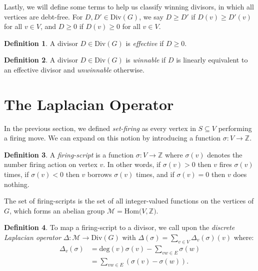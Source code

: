 \documentclass[openany, amssymb, psamsfonts]{amsart}
\theoremstyle{definition}
\newtheorem{defn}{Definition}[section]
\numberwithin{equation}{section}
\begin{document}
Lastly, we will define some terms to help us classify winning divisors, in which all vertices are debt-free. For $D, D'\in \text{Div}(G)$, we say $D\geq D'$ if $D(v)\geq D'(v)$ for all $v\in V$, and $D\geq 0$ if $D(v)\geq 0$ for all $v\in V$. 

\begin{defn}
\label{defn 3.6}
A divisor $D\in \text{Div}(G)$ is \textit{effective} if $D\geq 0$.
\end{defn}

\begin{defn}
\label{defn 3.7}
A divisor $D\in \text{Div}(G)$ is \textit{winnable} if $D$ is linearly equivalent to an effective divisor and \textit{unwinnable} otherwise.
\end{defn}





\section{The Laplacian Operator}
\label{4}

In the previous section, we defined \textit{set-firing} as every vertex in $S\subseteq V$ performing a firing move. We can expand on this notion by introducing a function $\sigma: V\rightarrow \mathbb{Z}$. 

\begin{defn}
\label{defn 4.1}
A \textit{firing-script} is a function $\sigma: V\rightarrow \mathbb{Z}$ where $\sigma(v)$ denotes the number firing action on vertex $v$. In other words, if $\sigma(v)>0$ then $v$ fires $\sigma(v)$ times, if $\sigma(v)<0$ then $v$ borrows $\sigma(v)$ times, and if $\sigma(v)=0$ then $v$ does nothing.
\end{defn}

The set of firing-scripts is the set of all integer-valued functions on the vertices of $G$, which forms an abelian group $\mathcal{M}=\text{Hom}(V,\mathbb{Z)}$.

\begin{defn}
\label{defn 4.2}
To map a firing-script to a divisor, we call upon the \textit{discrete Laplacian operator} $\Delta:\mathcal{M}\rightarrow \text{Div}(G)$ with $\Delta(\sigma)=\sum_{v\in V}\Delta_v(\sigma)(v)$ where:
\begin{align*}
    \Delta_v(\sigma)&=\text{deg}(v)\sigma(v)-\sum_{vw\in E}\sigma(w)\\
    &=\sum_{vw\in E}(\sigma(v)-\sigma(w)).
\end{align*}
\end{defn}
\end{document}
